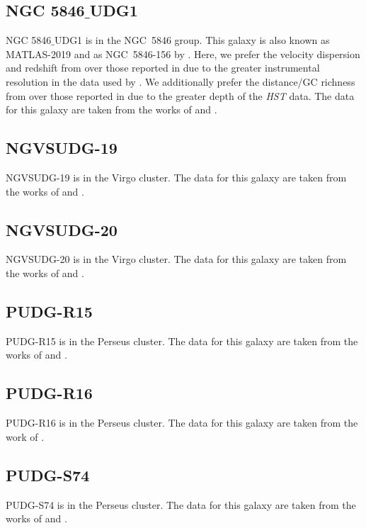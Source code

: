 \subsection{NGC 5846$\_$UDG1}
NGC 5846$\_$UDG1 is in the NGC~5846 group. This galaxy is also known as MATLAS-2019 \citep{Muller2020} and as NGC~5846-156 by \citet{Mahdavi2005}. Here, we prefer the velocity dispersion and redshift from \cite{Forbes2021} over those reported in \cite{Muller2020} due to the greater instrumental resolution in the data used by \citet{Forbes2021}. We additionally prefer the distance/GC richness from \cite{Danieli2022} over those reported in \cite{Muller2021} due to the greater depth of the \textit{HST} data. The data for this galaxy are taken from the works of \citet{Forbes2019, Muller2020, Muller2021, Forbes2021, Danieli2022} and \citet{FerreMateu2023}.

\subsection{NGVSUDG-19}
NGVSUDG-19 is in the Virgo cluster. The data for this galaxy are taken from the works of \citet{Lim2020} and \citet{Toloba2023}.

\subsection{NGVSUDG-20}
NGVSUDG-20 is in the Virgo cluster. The data for this galaxy are taken from the works of \citet{Lim2020} and \citet{Toloba2023}.

\subsection{PUDG-R15}
PUDG-R15 is in the Perseus cluster. The data for this galaxy are taken from the works of \citet{Gannon2022} and \citet{FerreMateu2023}. 

\subsection{PUDG-R16}
PUDG-R16 is in the Perseus cluster. The data for this galaxy are taken from the work of \citet{Gannon2022}.

\subsection{PUDG-S74}
PUDG-S74 is in the Perseus cluster. The data for this galaxy are taken from the works of \citet{Gannon2022} and \citet{FerreMateu2023}. 

